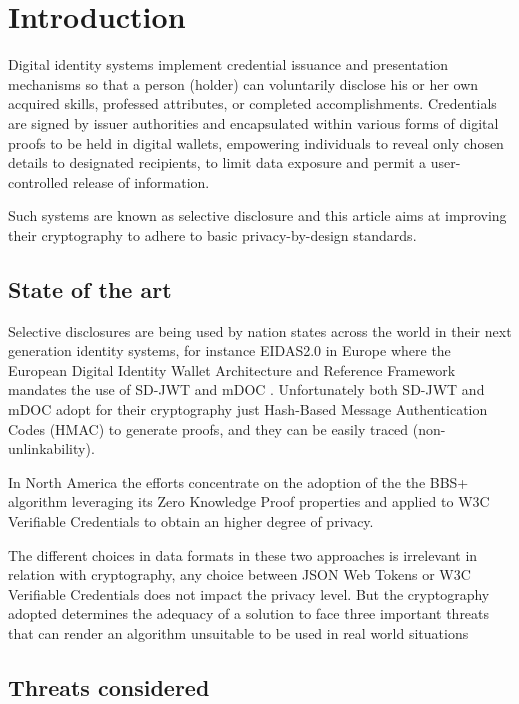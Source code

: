 \documentclass[conference]{IEEEtran}
\begin{document}
\section{Introduction}
Digital identity systems implement credential issuance and presentation mechanisms so that a person (holder) can voluntarily disclose his or her own acquired skills, professed attributes, or completed accomplishments. Credentials are signed by issuer authorities and encapsulated within various forms of digital proofs to be held in digital wallets, empowering individuals to reveal only chosen details to designated recipients, to limit data exposure and permit a user-controlled release of information.

Such systems are known as selective disclosure and this article aims at improving their cryptography to adhere to basic privacy-by-design standards.

\subsection{State of the art}

Selective disclosures are being used by nation states across the world in their next generation identity systems, for instance EIDAS2.0 in Europe where the European Digital Identity Wallet Architecture and Reference Framework\cite{eudi-arf} mandates the use of SD-JWT\cite{sd-jwt} and mDOC \cite{mdoc}. Unfortunately both SD-JWT and mDOC adopt for their cryptography just Hash-Based Message Authentication Codes (HMAC) to generate proofs, and they can be easily traced (non-unlinkability).

In North America the efforts concentrate on the adoption of the the BBS+ algorithm\cite{bbs+} leveraging its Zero Knowledge Proof properties and applied to W3C Verifiable Credentials\cite{w3c-vc} to obtain an higher degree of privacy.

The different choices in data formats in these two approaches is irrelevant in relation with cryptography, any choice between JSON Web Tokens or W3C Verifiable Credentials does not impact the privacy level. But the cryptography adopted determines the adequacy of a solution to face three important threats that can render an algorithm unsuitable to be used in real world situations

\subsection{Threats considered}
\end{document}
